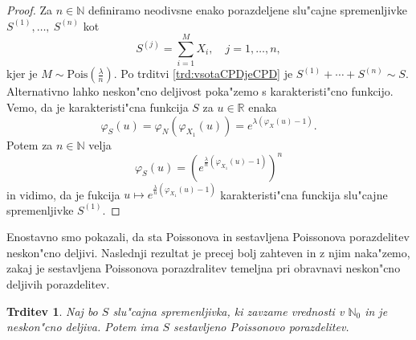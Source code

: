\documentclass[12pt, a4paper, reqno]{amsart}
\theoremstyle{definition}
\theoremstyle{plain}
\newtheorem{trditev}[definicija]{Trditev}
\newcommand{\R}{\mathbb{R}}
\newcommand{\N}{\mathbb{N}}
\newcommand{\1}{\mathds{1}}
\newcommand{\Pois}[1]{\text{Pois}(#1)}
\begin{document}
    \begin{proof}
        Za $n\in\N$ definiramo neodivsne enako porazdeljene slu"cajne spremenljivke $S^{(1)}, \dots, \ S^{(n)}$ 
        kot
        \begin{equation*}
            S^{(j)} = \sum_{i=1}^{M}X_i, \quad j = 1, \dots, n,
        \end{equation*}
        kjer je $M\sim\Pois{\frac{\lambda}{n}}$. Po trditvi \ref{trd:vsotaCPDjeCPD} je 
        $S^{(1)} + \cdots + S^{(n)}\sim S$. Alternativno lahko neskon"cno deljivost poka"zemo s karakteristi"cno funkcijo.
        Vemo, da je karakteristi"cna funkcija $S$ za $u\in \R$ enaka
        \begin{equation*}
            \varphi_S(u) = \varphi_N\left(\varphi_{X_1}(u)\right) = e^{\lambda\left(\varphi_X(u) - 1\right)}.
        \end{equation*}
        Potem za $n\in\N$ velja
        \begin{equation*}
            \varphi_{S}(u) = \left(e^{\frac{\lambda}{n}\left(\varphi_{X_1}(u) - 1\right)}\right)^n
        \end{equation*}
        in vidimo, da je fukcija $u\mapsto e^{\frac{\lambda}{n}\left(\varphi_{X_1}(u) - 1\right)}$ karakteristi"cna
        funckija slu"cajne spremenljivke $S^{(1)}$.
    \end{proof}

    Enostavno smo pokazali, da sta Poissonova in sestavljena Poissonova porazdelitev neskon"cno deljivi. 
    Naslednji rezultat je precej bolj zahteven in z njim naka"zemo, zakaj je sestavljena Poissonova 
    porazdralitev temeljna pri obravnavi neskon"cno deljivih porazdelitev.
    
    \begin{trditev}
        Naj bo $S$ slu"cajna spremenljivka, ki zavzame vrednosti v $\N_0$ in je neskon"cno deljiva.
        Potem ima $S$ sestavljeno Poissonovo porazdelitev.
        \label{trd:neskoncnoDeljivaYslediCPD}
    \end{trditev}
\end{document}
